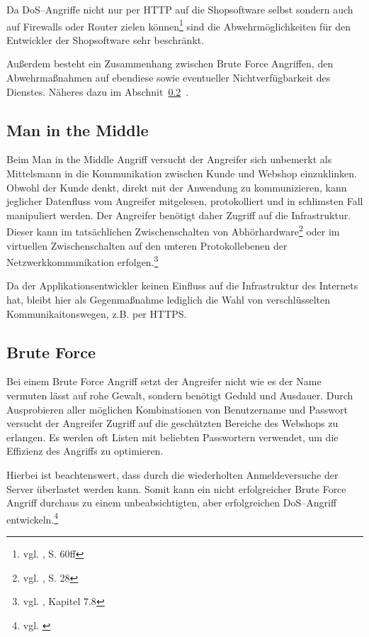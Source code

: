 Da \ac{DoS}--Angriffe nicht nur per \ac{HTTP} auf die Shopsoftware selbst sondern auch auf Firewalls oder Router zielen können\footnote{vgl. \cite{amoroso}, S. 60ff} sind die Abwehrmöglichkeiten für den Entwickler der Shopsoftware sehr beschränkt.

Außerdem besteht ein Zusammenhang zwischen Brute Force Angriffen, den Abwehrmaßnahmen auf ebendiese sowie eventueller Nichtverfügbarkeit des Dienstes. Näheres dazu im Abschnit~\ref{sec:bruteforce}~. 

\subsection{Man in the Middle}

Beim Man in the Middle Angriff versucht der Angreifer sich unbemerkt als Mittelsmann in die Kommunikation zwischen Kunde und Webshop einzuklinken. Obwohl der Kunde denkt, direkt mit der Anwendung zu kommunizieren, kann jeglicher Datenfluss vom Angreifer mitgelesen, protokolliert und in schlimsten Fall manipuliert werden. Der Angreifer benötigt daher Zugriff auf die Infrastruktur. Dieser kann im tatsächlichen Zwischenschalten von Abhörhardware\footnote{vgl. \cite{stoll}, S. 28} oder im virtuellen Zwischenschalten auf den unteren Protokollebenen der Netzwerkkommunikation erfolgen.\footnote{vgl. \cite{pritchett}, Kapitel 7.8}

Da der Applikationsentwickler keinen Einfluss auf die Infrastruktur des Internets hat, bleibt hier als Gegenmaßnahme lediglich die Wahl von verschlüsselten Kommunikaitonswegen, z.B. per \ac{HTTPS}.

\subsection{Brute Force}
\label{sec:bruteforce}

Bei einem Brute Force Angriff setzt der Angreifer nicht wie es der Name vermuten lässt auf rohe Gewalt, sondern benötigt Geduld und Ausdauer. Durch Ausprobieren aller möglichen Kombinationen von Benutzername und Passwort versucht der Angreifer Zugriff auf die geschützten Bereiche des Webshops zu erlangen. Es werden oft Listen mit beliebten Passwortern verwendet, um die Effizienz des Angriffs zu optimieren.

Hierbei ist beachtenswert, dass durch die wiederholten Anmeldeversuche der Server überlastet werden kann. Somit kann ein nicht erfolgreicher Brute Force Angriff durchaus zu einem unbeabsichtigten, aber erfolgreichen \ac{DoS}--Angriff entwickeln.\footnote{vgl. \cite{defat}}

